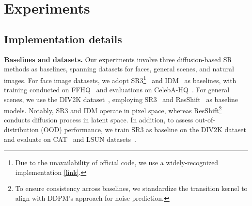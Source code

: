 \section{Experiments}
\label{sec:exp}




\subsection{Implementation details}


\textbf{Baselines and datasets.}
Our experiments involve three diffusion-based SR methods as baselines, spanning datasets for faces, general scenes, and natural images. For face image datasets, we adopt SR3\footnote{Due to the unavailability of official code, we use a widely-recognized implementation \href{https://github.com/Janspiry/Image-Super-Resolution-via-Iterative-Refinement}{[link]}.}~\cite{saharia2022image}  and IDM~\cite{gao2023implicit} as baselines, with  training conducted on FFHQ~\cite{karras2019style} and evaluations on CelebA-HQ~\cite{karras2017progressive}.  For general scenes, we use the DIV2K dataset~\cite{agustsson2017ntire}, employing SR3~\cite{saharia2022image} and ResShift~\cite{yue2023resshift} as baseline models. Notably, SR3 and IDM operate in pixel space, whereas ResShift\footnote{To ensure consistency across baselines, we standardize the transition kernel to align with DDPM's approach for noise prediction.} conducts diffusion process in latent space. In addition, to assess out-of-distribution (OOD) performance, we train SR3 as baseline on the DIV2K dataset and evaluate on CAT~\cite{zhang2008cat} and LSUN datasets~\cite{yu2015lsun}. 

